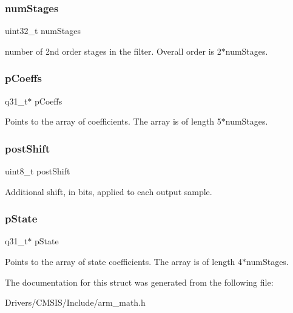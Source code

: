 \subsubsection{\texorpdfstring{num\+Stages}{numStages}}
{\footnotesize\ttfamily uint32\+\_\+t num\+Stages}

number of 2nd order stages in the filter. Overall order is 2$\ast$num\+Stages. \mbox{\label{structarm__biquad__casd__df1__inst__q31_a68888e36167d81cb7836db10367a1682}} 
\subsubsection{\texorpdfstring{p\+Coeffs}{pCoeffs}}
{\footnotesize\ttfamily q31\+\_\+t$\ast$ p\+Coeffs}

Points to the array of coefficients. The array is of length 5$\ast$num\+Stages. \mbox{\label{structarm__biquad__casd__df1__inst__q31_a74050e9f36542bd56f4052381a82ae8f}} 
\subsubsection{\texorpdfstring{post\+Shift}{postShift}}
{\footnotesize\ttfamily uint8\+\_\+t post\+Shift}

Additional shift, in bits, applied to each output sample. \mbox{\label{structarm__biquad__casd__df1__inst__q31_adee4ba3ee8869865af7d8fa08ca913d6}} 
\subsubsection{\texorpdfstring{p\+State}{pState}}
{\footnotesize\ttfamily q31\+\_\+t$\ast$ p\+State}

Points to the array of state coefficients. The array is of length 4$\ast$num\+Stages. 

The documentation for this struct was generated from the following file\+:\begin{DoxyCompactItemize}
\item 
Drivers/\+C\+M\+S\+I\+S/\+Include/arm\+\_\+math.\+h\end{DoxyCompactItemize}
